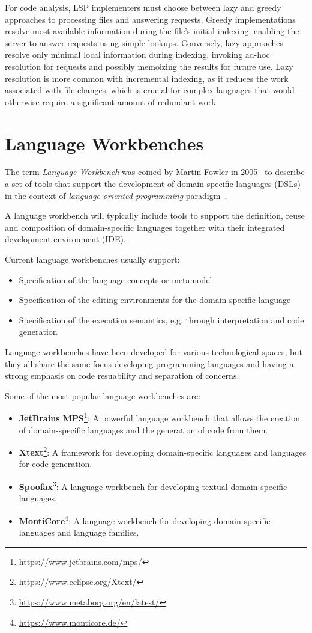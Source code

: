 For code analysis, LSP implementers must choose between lazy and greedy approaches to processing files and answering requests. Greedy implementations resolve most available information during the file's initial indexing, enabling the server to answer requests using simple lookups. Conversely, lazy approaches resolve only minimal local information during indexing, invoking ad-hoc resolution for requests and possibly memoizing the results for future use. Lazy resolution is more common with incremental indexing, as it reduces the work associated with file changes, which is crucial for complex languages that would otherwise require a significant amount of redundant work.

\section{Language Workbenches}\label{sec:bckgnd:language-workbenches}

The term \textit{Language Workbench} was coined by Martin Fowler in 2005~\cite{Fowler05} to describe a set of tools that support the development of domain-specific languages (DSLs) in the context of \textit{language-oriented programming} paradigm~\cite{Ward94}.

A language workbench will typically include tools to support the definition, reuse and composition of domain-specific languages together with their integrated development environment (IDE).

Current language workbenches usually support:
\begin{itemize}
    \item Specification of the language concepts or metamodel
    \item Specification of the editing environments for the domain-specific language
    \item Specification of the execution semantics, e.g. through interpretation and code generation
\end{itemize}

Language workbenches have been developed for various technological spaces, but they all share the same focus developing programming languages and having a strong emphasis on code resuability and separation of concerns.

 Some of the most popular language workbenches are:
\begin{itemize}
    \item \textbf{JetBrains MPS}\footnote{\url{https://www.jetbrains.com/mps/}}: A powerful language workbench that allows the creation of domain-specific languages and the generation of code from them.
    \item \textbf{Xtext}\footnote{\url{https://www.eclipse.org/Xtext/}}: A framework for developing domain-specific languages and languages for code generation.
    \item \textbf{Spoofax}\footnote{\url{https://www.metaborg.org/en/latest/}}: A language workbench for developing textual domain-specific languages.
    \item \textbf{MontiCore}\footnote{\url{https://www.monticore.de/}}: A language workbench for developing domain-specific languages and language families.
\end{itemize}


